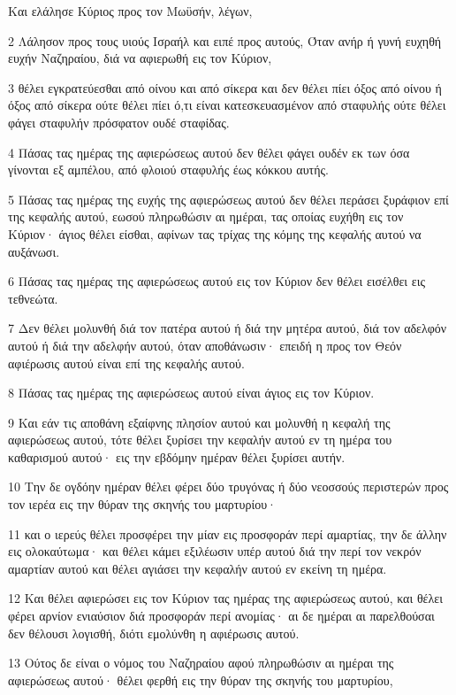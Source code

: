 \par Και ελάλησε Κύριος προς τον Μωϋσήν, λέγων,
\par 2 Λάλησον προς τους υιούς Ισραήλ και ειπέ προς αυτούς, Όταν ανήρ ή γυνή ευχηθή ευχήν Ναζηραίου, διά να αφιερωθή εις τον Κύριον,
\par 3 θέλει εγκρατεύεσθαι από οίνου και από σίκερα και δεν θέλει πίει όξος από οίνου ή όξος από σίκερα ούτε θέλει πίει ό,τι είναι κατεσκευασμένον από σταφυλής ούτε θέλει φάγει σταφυλήν πρόσφατον ουδέ σταφίδας.
\par 4 Πάσας τας ημέρας της αφιερώσεως αυτού δεν θέλει φάγει ουδέν εκ των όσα γίνονται εξ αμπέλου, από φλοιού σταφυλής έως κόκκου αυτής.
\par 5 Πάσας τας ημέρας της ευχής της αφιερώσεως αυτού δεν θέλει περάσει ξυράφιον επί της κεφαλής αυτού, εωσού πληρωθώσιν αι ημέραι, τας οποίας ευχήθη εις τον Κύριον· άγιος θέλει είσθαι, αφίνων τας τρίχας της κόμης της κεφαλής αυτού να αυξάνωσι.
\par 6 Πάσας τας ημέρας της αφιερώσεως αυτού εις τον Κύριον δεν θέλει εισέλθει εις τεθνεώτα.
\par 7 Δεν θέλει μολυνθή διά τον πατέρα αυτού ή διά την μητέρα αυτού, διά τον αδελφόν αυτού ή διά την αδελφήν αυτού, όταν αποθάνωσιν· επειδή η προς τον Θεόν αφιέρωσις αυτού είναι επί της κεφαλής αυτού.
\par 8 Πάσας τας ημέρας της αφιερώσεως αυτού είναι άγιος εις τον Κύριον.
\par 9 Και εάν τις αποθάνη εξαίφνης πλησίον αυτού και μολυνθή η κεφαλή της αφιερώσεως αυτού, τότε θέλει ξυρίσει την κεφαλήν αυτού εν τη ημέρα του καθαρισμού αυτού· εις την εβδόμην ημέραν θέλει ξυρίσει αυτήν.
\par 10 Την δε ογδόην ημέραν θέλει φέρει δύο τρυγόνας ή δύο νεοσσούς περιστερών προς τον ιερέα εις την θύραν της σκηνής του μαρτυρίου·
\par 11 και ο ιερεύς θέλει προσφέρει την μίαν εις προσφοράν περί αμαρτίας, την δε άλλην εις ολοκαύτωμα· και θέλει κάμει εξιλέωσιν υπέρ αυτού διά την περί τον νεκρόν αμαρτίαν αυτού και θέλει αγιάσει την κεφαλήν αυτού εν εκείνη τη ημέρα.
\par 12 Και θέλει αφιερώσει εις τον Κύριον τας ημέρας της αφιερώσεως αυτού, και θέλει φέρει αρνίον ενιαύσιον διά προσφοράν περί ανομίας· αι δε ημέραι αι παρελθούσαι δεν θέλουσι λογισθή, διότι εμολύνθη η αφιέρωσις αυτού.
\par 13 Ούτος δε είναι ο νόμος του Ναζηραίου αφού πληρωθώσιν αι ημέραι της αφιερώσεως αυτού· θέλει φερθή εις την θύραν της σκηνής του μαρτυρίου,
